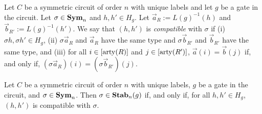 \documentclass[../paper.tex]{subfiles}
\begin{document}



\begin{definition}
  Let $C$ be a symmetric circuit of order $n$ with unique labels and let $g$ be
  a gate in the circuit. Let $\sigma \in \text{\textbf{Sym}}_n$ and $h, h' \in H_g$. Let
  $\vec{a}_R:= L(g)^{-1}(h)$ and $\vec{b}_{R'} := L(g)^{-1}(h')$. We say that
  $(h, h')$ is \emph{compatible} with $\sigma$ if (i) $\sigma h, \sigma h' \in
  H_g$, (ii) $\sigma \vec{a}_R$ and $\vec{a}_R$ have the same type and $\sigma
  \vec{b}_{R'}$ and $\vec{b}_{R'}$ have the same type, and (iii) for all $i \in
  [\mathrm{arty}(R)]$ and $j \in [\mathrm{arty}(R')]$, $\vec{a}(i) = \vec{b}(j)$ if, and only
  if, $(\sigma \vec{a}_R)(i) = (\sigma \vec{b}_{R'})(j).$
\end{definition}

\begin{lem}
  Let $C$ be a symmetric circuit of order $n$ with unique labels, $g$ be a gate
  in the circuit, and $\sigma \in \text{\textbf{Sym}}_n$. Then $\sigma \in \text{\textbf{Stab}}_n(g)$ if, and
  only if, for all $h, h' \in H_g$, $(h, h')$ is compatible with $\sigma$.
  \label{lem:isostab-compatible}
\end{lem}
\end{document}
